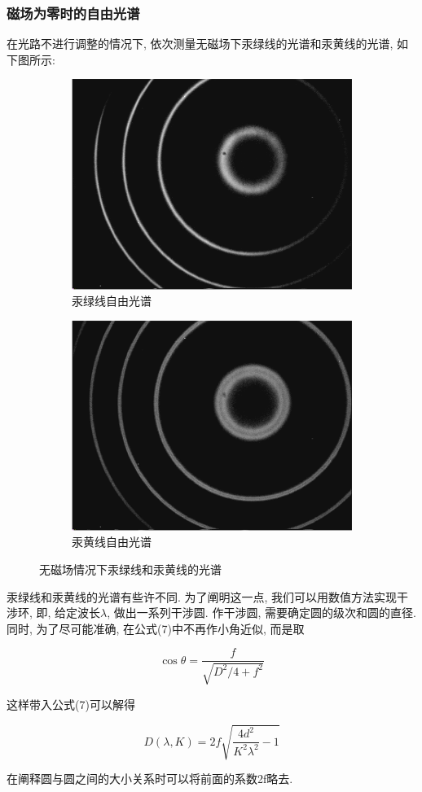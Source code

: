 \documentclass[12pt,a4paper]{article}
\newcommand{\be}[1]{
    \begin{equation}
        #1
    \end{equation}
}
\begin{document}
\subsubsection{磁场为零时的自由光谱}
在光路不进行调整的情况下, 依次测量无磁场下汞绿线的光谱和汞黄线的光谱, 如下图所示: 
\begin{figure}[H]
    \centering
    \begin{subfigure}[b]{0.45\textwidth}
      \centering
      \includegraphics[width=\textwidth]{freegg.jpg}
      \caption{汞绿线自由光谱}
    \end{subfigure}
    \hfill
    \begin{subfigure}[b]{0.45\textwidth}
      \centering
      \includegraphics[width=\textwidth]{freeyy.jpg}
      \caption{汞黄线自由光谱}
    \end{subfigure}
  \caption{无磁场情况下汞绿线和汞黄线的光谱}
  \end{figure}
汞绿线和汞黄线的光谱有些许不同. 为了阐明这一点, 我们可以用数值方法实现干涉环, 即, 给定波长$\lambda$, 做出一系列干涉圆. 
作干涉圆, 需要确定圆的级次和圆的直径. 同时, 为了尽可能准确, 在公式(7)中不再作小角近似, 而是取
\be{\cos{\theta}=\frac{f}{\sqrt{D^2/4+f^2}}}
这样带入公式(7)可以解得
\be{D(\lambda,K)=2f \sqrt{\frac{4d^2}{K^2\lambda^2}-1}}
在阐释圆与圆之间的大小关系时可以将前面的系数2f略去. 
\end{document}
